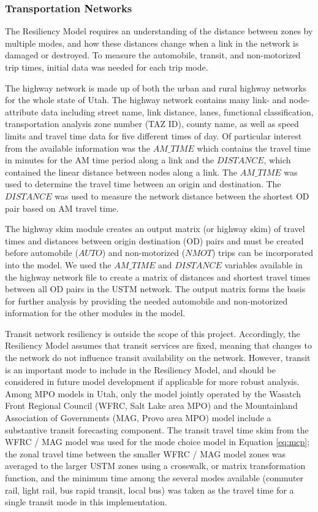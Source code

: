 \subsubsection{Transportation Networks}

The Resiliency Model requires an understanding of the distance between zones by multiple modes, and how
these distances change when a link in the network is damaged or destroyed. To measure the
automobile, transit, and non-motorized trip times, initial data was needed for each trip mode.

The highway network is made up of both the urban and rural highway networks
for the whole state of Utah. The highway network contains many link- and
node-attribute data including street name, link distance, lanes, functional
classification, transportation analysis zone number (TAZ ID), county name,
as well as speed limits and travel time data for five different times of day.
Of particular interest from the available information was the \(AM\_TIME\) which
contains the travel time in minutes for the AM time period along a link and
the \(DISTANCE\), which contained the linear distance between nodes along a link.
The \(AM\_TIME\) was used to determine the travel time between an origin and
destination. The \(DISTANCE\) was used to measure the network distance between
the shortest OD pair based on AM travel time.

The highway skim module creates an output matrix (or highway skim) of travel
times and distances between origin destination (OD) pairs and must be created
before automobile (\(AUTO\)) and non-motorized (\(NMOT\)) trips can be incorporated
into the model. We used the \(AM\_TIME\) and \(DISTANCE\) variables available in
the highway network file to create a matrix of distances and shortest travel
times between all OD pairs in the USTM network. The output matrix forms the
basis for further analysis by providing the needed automobile and non-motorized
information for the other modules in the model.

Transit network resiliency is outside the scope of this project. Accordingly, the Resiliency
Model assumes that transit services are fixed, meaning that changes to the
network do not influence transit availability on the network. However, transit
is an important mode to include in the Resiliency Model, and  should be
considered in future model development if applicable for more robust analysis.
Among MPO models in Utah, only the model jointly operated by the
Wasatch Front Regional Council (WFRC, Salt Lake area MPO) and the
Mountainland Association of Governments (MAG, Provo area MPO) model include a
substantive transit forecasting component. The transit travel time skim from the
WFRC / MAG model was used for the mode choice model in Equation \eqref{eq:mcp};
the zonal travel time between the smaller WFRC / MAG model zones was averaged
to the larger USTM zones using a crosswalk, or matrix transformation function, and the minimum time among the several modes available
(commuter rail, light rail, bus rapid transit, local bus) was taken as the travel
time for a single transit mode in this implementation.

